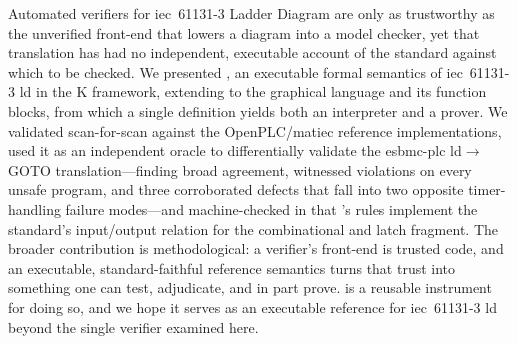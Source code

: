 Automated verifiers for \gls{iec}~61131-3 Ladder Diagram are only as trustworthy as
the unverified front-end that lowers a diagram into a model checker, yet that
translation has had no independent, executable account of the standard against which
to be checked. We presented \kld{}, an executable formal semantics of
\gls{iec}~61131-3 \gls{ld} in the \textsf{K} framework, extending \kst{} to the
graphical language and its function blocks, from which a single definition yields
both an interpreter and a prover. We validated \kld{} scan-for-scan against the
OpenPLC/\gls{matiec} reference implementations, used it as an independent oracle to
differentially validate the \gls{esbmc}-\gls{plc} \gls{ld}$\rightarrow$GOTO
translation---finding broad agreement, witnessed violations on every unsafe
program, and three corroborated defects that fall into two opposite timer-handling
failure modes---and machine-checked in  that \kld{}'s rules implement
the standard's input/output relation for the combinational and latch fragment. The
broader contribution is methodological: a verifier's front-end is trusted code, and
an executable, standard-faithful reference semantics turns that trust into something
one can test, adjudicate, and in part prove. \kld{} is a reusable instrument for
doing so, and we hope it serves as an executable reference for \gls{iec}~61131-3
\gls{ld} beyond the single verifier examined here.
